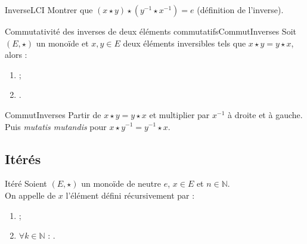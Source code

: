 \documentclass[12pt,a4paper]{report}
\begin{document}
    \begin{principedemo}{InverseLCI}
    Montrer que $(x \star y) \star \left(y^{-1} \star x^{-1} \right) = e$ (définition de l'inverse).
    \end{principedemo}
    
    \begin{proposition}{Commutativité des inverses de deux éléments commutatifs}{CommutInverses}
    Soit $(E, \star)$ un monoïde et $x, y \in E$ deux éléments inversibles tels que $x \star y = y \star x$, alors :
    \begin{multicols}{2}
    \begin{enumerate}[label=\bfseries\arabic*)]
        \item\label{PropInvCom1}  ;
        \item\label{PropInvCom2} .
    \end{enumerate}
    \end{multicols}
    \smallskip
    \end{proposition}
    
    \begin{principedemo}{CommutInverses}
    Partir de $x \star y = y \star x$ et multiplier par $x^{-1}$ à droite et à gauche. Puis \textit{mutatis mutandis} pour $x \star y^{-1} = y^{-1} \star x$.
    \end{principedemo}
    
    \pagebreak
    
    \subsection{Itérés}
    
    \begin{definition}{Itéré}{}
    Soient $(E, \star)$ un monoïde de neutre $e$, $x \in E$ et $n \in \mathbb{N}$.\\
    On appelle  de $x$ l'élément  défini récursivement par :
    \begin{multicols}{2}
    \begin{enumerate}[label=\bfseries\arabic*)]
        \item {} ;
        \item $\forall k \in \mathbb{N}$ : .
    \end{enumerate}
    \end{multicols}
    \end{definition}
    
\end{document}
